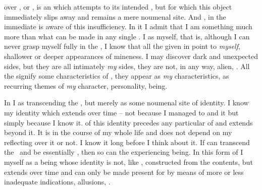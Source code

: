 \pa {} over , or , is an 
which attempts to  its intended , but for which this
object immediately slips away and remains a mere noumenal site.  And
, in the immediate  is aware of this
insufficiency. In it I admit that I am something much more than what can be made
 in any single .  I   as
myself, that is, although I can never grasp myself fully in the \hoa, I know
that all the  given in  point to {\em myself},
shallower or deeper appearances of mineness. I may discover dark and unexpected
sides, but they are all intimately {\em my} sides, they are not, in any way,
alien, .  All the  signify some characteristics of
, they appear as {\em my} characteristics, as recurring themes of
{\em my} character, personality, being.

In  I   as transcending the
\hoa, but merely as some noumenal site of identity.  I know my identity which
extends over time -- not because I managed to  and
 it but simply because I know it.  of this
identity precedes any particular  of  and extends beyond
it. It is  in the course of my whole life and does not
depend on my reflecting over it or not. I know it long before I
 think about it. 
If  can transcend the \hoa\ and be essentially 
, then so can the experiencing being. In this form of 
 I  myself as a being whose identity is not, like 
, constructed from the  contents, but extends over time 
and can only be made present for  by means of more or less 
inadequate indications, allusions, .


